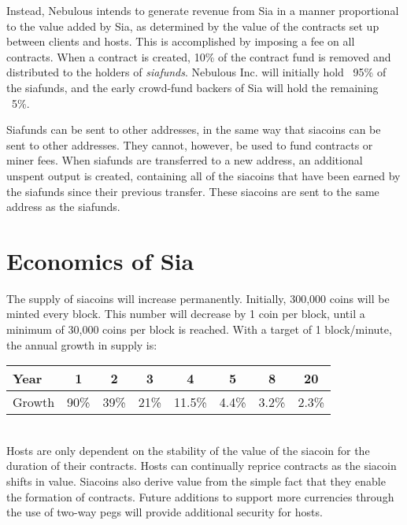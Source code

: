 \documentclass[twocolumn]{article}
\begin{document}
Instead, Nebulous intends to generate revenue from Sia in a manner proportional to the value added by Sia, as determined by the value of the contracts set up between clients and hosts.
This is accomplished by imposing a fee on all contracts.
When a contract is created, 10\% of the contract fund is removed and distributed to the holders of \textit{siafunds}.
Nebulous Inc. will initially hold ~95\% of the siafunds, and the early crowd-fund backers of Sia will hold the remaining ~5\%.

Siafunds can be sent to other addresses, in the same way that siacoins can be sent to other addresses.
They cannot, however, be used to fund contracts or miner fees.
When siafunds are transferred to a new address, an additional unspent output is created, containing all of the siacoins that have been earned by the siafunds since their previous transfer.
These siacoins are sent to the same address as the siafunds.

\section{Economics of Sia}
The supply of siacoins will increase permanently.
Initially, 300,000 coins will be minted every block.
This number will decrease by 1 coin per block, until a minimum of 30,000 coins per block is reached.
With a target of 1 block/minute, the annual growth in supply is:\\

\tabcolsep=0.11cm \noindent
\begin{tabular}{ l | *{7}{c} }
	Year   &   1  &  2   &   3  &   4    &   5   &  8    & 20    \\ \hline
	Growth & 90\% & 39\% & 21\% & 11.5\% & 4.4\% & 3.2\% & 2.3\%
\end{tabular} \\

Hosts are only dependent on the stability of the value of the siacoin for the duration of their contracts.
Hosts can continually reprice contracts as the siacoin shifts in value.
Siacoins also derive value from the simple fact that they enable the formation of contracts.
Future additions to support more currencies through the use of two-way pegs will provide additional security for hosts.

\end{document}
